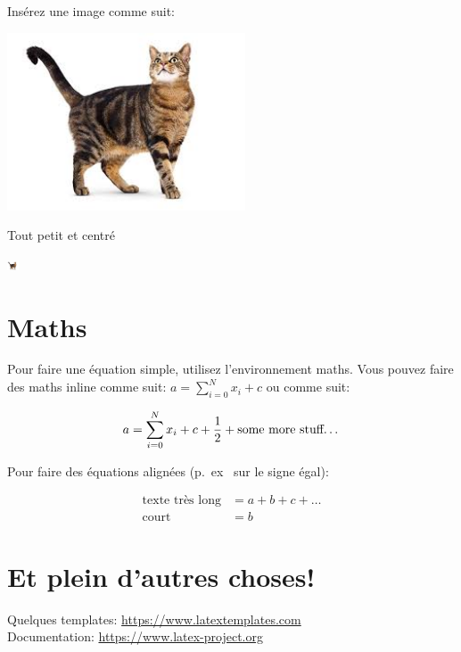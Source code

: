 \documentclass[paper=a4, fontsize=11pt]{article}
\begin{document}
\vspace{0.5cm} %

Insérez une image comme suit:

\includegraphics[width=200pt]{myimage.jpg} %

Tout petit et centré

\begin{center}
\includegraphics[width=10pt]{myimage.jpg} %
\end{center}

\section{Maths}

Pour faire une équation simple, utilisez l'environnement maths. Vous pouvez faire des maths inline
comme suit: $a = \sum_{i=0}^{N} x_i + c$ ou comme suit:

\[ a = \sum_{i=0}^{N} x_i + c + \dfrac{1}{2} + \text{some more stuff\dots}\]


Pour faire des équations alignées (p.~ex~ sur le signe égal):

\begin{align}
\text{texte très long} &= a + b + c + \ldots \\
\text{court} &= b
\end{align}


\section{Et plein d'autres choses!}

Quelques templates: \url{https://www.latextemplates.com} \\
Documentation: \url{https://www.latex-project.org}
\end{document}
